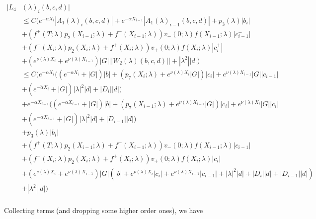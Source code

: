 \documentclass[12pt]{article}
\begin{document}
\begin{enumerate}
\begin{align*}
|L_4&(\lambda)_i(b, c, d)|\\ 
&\leq C \Big( e^{-\alpha X_i} |A_1(\lambda)_i(b, c, d)| +  e^{-\alpha X_{i-1}} |A_1(\lambda)_{i-1}(b, c, d)| + p_3(\lambda) |b_i| \\
&+ (f^+(T; \lambda) p_2(X_{i-1}; \lambda) + f^-(X_{i-1}; \lambda)) v_-(0; \lambda)  f(X_{i-1}; \lambda) |c_{i-1}^-| \\
&+ (f^-(X_i; \lambda) p_2(X_i; \lambda) + f^+(X_i; \lambda)) v_+(0; \lambda) f(X_i; \lambda)  |c_i^+| \\
&+ (e^{\nu(\lambda)X_i} + e^{\nu(\lambda)X_{i-1}}) |G| ||W_2(\lambda)(b,c,d)|| + |\lambda^2| |d| \Big) \\
&\leq C \Big( e^{-\alpha X_i} ( (e^{-\alpha X_i} + |G|) |b| 
+ ( p_7(X_i; \lambda) + e^{\nu(\lambda)X_i} |G|) |c_i| + e^{\nu(\lambda)X_{i-1}} |G| |c_{i-1}| \\
&+ (e^{-\tilde{\alpha} X_i} + |G|) |\lambda|^2 |d| + |D_i||d| ) \\
&+ e^{-\alpha X_{i-1}} ( (e^{-\alpha X_{i-1}} + |G|) |b| 
+ ( p_7(X_{i-1}; \lambda) + e^{\nu(\lambda)X_{i-1}} |G|) |c_i| + e^{\nu(\lambda)X_i} |G| |c_i| \\
&+ (e^{-\tilde{\alpha} X_{i-1}} + |G|) |\lambda|^2 |d| + |D_{i-1}||d| ) \\
&+ p_3(\lambda) |b_i| \\
&+ (f^+(T; \lambda) p_2(X_{i-1}; \lambda) + f^-(X_{i-1}; \lambda)) v_-(0; \lambda)  f(X_{i-1}; \lambda) |c_{i-1}| \\
&+ (f^-(X_i; \lambda) p_2(X_i; \lambda) + f^+(X_i; \lambda)) v_+(0; \lambda) f(X_i; \lambda)  |c_i| \\
&+ (e^{\nu(\lambda)X_i} + e^{\nu(\lambda)X_{i-1}}) |G| ( |b| + e^{\nu(\lambda)X_i} |c_i| + e^{\nu(\lambda)X_{i-1}} |c_{i-1}| 
+ |\lambda|^2 |d| + |D_i||d| + |D_{i-1}||d|)\\ 
&+ |\lambda^2| |d| \Big) \\
\end{align*}

Collecting terms (and dropping some higher order ones), we have


\end{enumerate}
\end{document}
